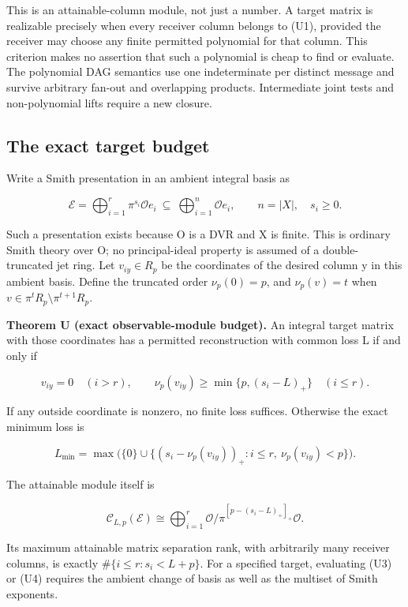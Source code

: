 \documentclass[11pt,a4paper]{article}
\begin{document}
This is an attainable-column module, not just a number. A target matrix
is realizable precisely when every receiver column belongs to (U1),
provided the receiver may choose any finite permitted polynomial for
that column. This criterion makes no assertion that such a polynomial is
cheap to find or evaluate. The polynomial DAG semantics use one
indeterminate per distinct message and survive arbitrary fan-out and
overlapping products. Intermediate joint tests and non-polynomial lifts
require a new closure.

\subsection{The exact target budget}\label{v8-the-exact-target-budget}

Write a Smith presentation in an ambient integral basis as

\[
 \mathcal E=\bigoplus_{i=1}^{r}\pi^{s_i}\mathcal O e_i
 \ \subseteq\ \bigoplus_{i=1}^{n}\mathcal O e_i,
 \qquad n=|X|,\quad s_i\ge0. \tag{U2}
\]

Such a presentation exists because O is a DVR and X is finite. This is
ordinary Smith theory over O; no principal-ideal property is assumed of
a double-truncated jet ring. Let \(v_{iy}\in R_p\) be the coordinates of
the desired column y in this ambient basis. Define the truncated order
\(\nu_p(0)=p\), and \(\nu_p(v)=t\) when
\(v\in\pi^tR_p\setminus\pi^{t+1}R_p\).

\textbf{Theorem U (exact observable-module budget).} An integral target
matrix with those coordinates has a permitted reconstruction with common
loss L if and only if

\[
 v_{iy}=0\quad(i>r),\qquad
 \nu_p(v_{iy})\ge\min\{p,(s_i-L)_+\}\quad(i\le r). \tag{U3}
\]

If any outside coordinate is nonzero, no finite loss suffices. Otherwise
the exact minimum loss is

\[
 L_{\min}=\max\bigl(\{0\}\cup
     \{(s_i-\nu_p(v_{iy}))_+:i\le r,\ \nu_p(v_{iy})<p\}\bigr).
 \tag{U4}
\]

The attainable module itself is

\[
 \mathcal C_{L,p}(\mathcal E)\cong
 \bigoplus_{i=1}^{r}
 \mathcal O/\pi^{[p-(s_i-L)_+]_+}\mathcal O. \tag{U5}
\]

Its maximum attainable matrix separation rank, with arbitrarily many
receiver columns, is exactly \(\#\{i\le r:s_i<L+p\}\). For a specified
target, evaluating (U3) or (U4) requires the ambient change of basis as
well as the multiset of Smith exponents.
\end{document}

